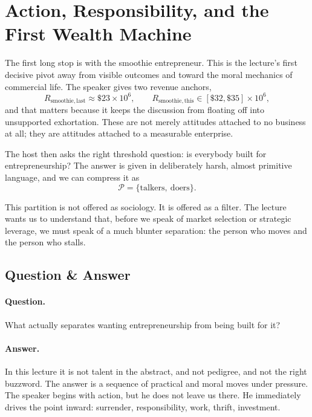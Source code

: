 \section{Action, Responsibility, and the First Wealth Machine}

The first long stop is with the smoothie entrepreneur. This is the lecture's first decisive pivot away from visible outcomes and toward the moral mechanics of commercial life. The speaker gives two revenue anchors,
\begin{equation}
R_{\mathrm{smoothie,last}} \approx \$23\times 10^{6},
\qquad
R_{\mathrm{smoothie,this}} \in [\$32,\$35]\times 10^{6},
\end{equation}
and that matters because it keeps the discussion from floating off into unsupported exhortation. These are not merely attitudes attached to no business at all; they are attitudes attached to a measurable enterprise.

The host then asks the right threshold question: is everybody built for entrepreneurship? The answer is given in deliberately harsh, almost primitive language, and we can compress it as
\begin{equation}
\mathcal{P}=\{\text{talkers},\ \text{doers}\}.
\end{equation}

This partition is not offered as sociology. It is offered as a filter. The lecture wants us to understand that, before we speak of market selection or strategic leverage, we must speak of a much blunter separation: the person who moves and the person who stalls.

\subsection{Question \& Answer}

\paragraph{Question.} What actually separates wanting entrepreneurship from being built for it?

\paragraph{Answer.} In this lecture it is not talent in the abstract, and not pedigree, and not the right buzzword. The answer is a sequence of practical and moral moves under pressure. The speaker begins with action, but he does not leave us there. He immediately drives the point inward: surrender, responsibility, work, thrift, investment.

